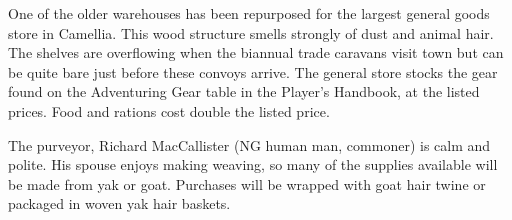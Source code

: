 One of the older warehouses has been repurposed for the largest general goods store in Camellia.
This wood structure smells strongly of dust and animal hair.
The shelves are overflowing when the biannual trade caravans visit town but can be quite bare just before these convoys arrive.
The general store stocks the gear found on the Adventuring Gear table in the Player's Handbook, at the listed prices. Food and rations cost double the listed price.

The purveyor, Richard MacCallister (NG human man, commoner) is calm and polite.
His spouse enjoys making weaving, so many of the supplies available will be made from yak or goat.
Purchases will be wrapped with goat hair twine or packaged in woven yak hair baskets.
